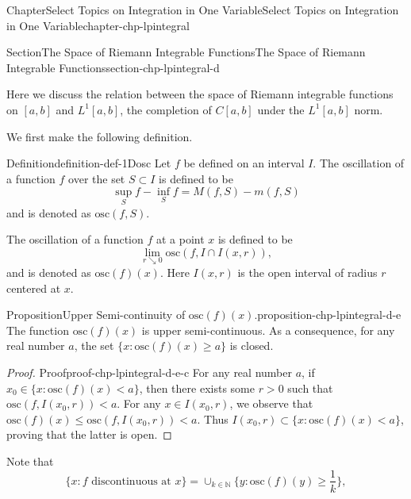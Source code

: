 \documentclass[oneside,10pt,]{book}
\numberwithin{equation}{section}
\newcommand{\bbN}{\mathbb{N}}
\newcommand{\osc}{\text{osc}}
\begin{document}
\begin{chapterptx}{Chapter}{Select Topics on Integration in One Variable}{}{Select Topics on Integration in One Variable}{}{}{chapter-chp-lpintegral}
\typeout{************************************************}
%
\begin{sectionptx}{Section}{The Space of Riemann Integrable Functions}{}{The Space of Riemann Integrable Functions}{}{}{section-chp-lpintegral-d}
\begin{introduction}{}%
Here we discuss the relation between the space of Riemann integrable functions on \([a, b]\) and \(L^{1}[a, b]\), the completion of \(C[a, b]\) under the \(L^{1}[a, b]\) norm.\end{introduction}%
We first make the following definition.%
\begin{definition}{Definition}{}{definition-def-1Dosc}%
%
\label{notation-def-1Dosc-b}%
Let \(f\) be defined on an interval \(I\). The oscillation of a function \(f\) over the set \(S \subset I\) is defined to be%
\begin{equation*}
\sup_{S}f - \inf_{S}f = M(f, S)-m(f, S)
\end{equation*}
and is denoted as \(\osc(f, S)\).%
\par
The oscillation of a function \(f\)  at a point \(x\) is defined to be%
\begin{equation*}
\lim_{r\searrow 0} \osc(f, I\cap I(x, r)),
\end{equation*}
and is denoted as \(\osc(f)(x)\). Here \(I(x, r)\) is the open interval of radius \(r\) centered at \(x\).%
\end{definition}
\begin{proposition}{Proposition}{Upper Semi-continuity of \(\osc(f)(x)\).}{}{proposition-chp-lpintegral-d-e}%
The function \(\osc(f)(x)\) is upper 	semi-continuous. As a consequence, for any real number \(a\), the set \(\{x: 	\osc(f)(x)\ge a \}\) is closed.\end{proposition}
\begin{proof}{Proof}{}{proof-chp-lpintegral-d-e-c}
For any real number \(a\), if \(x_{0}\in \{x: 	\osc(f)(x) < a\}\), then there exists some \(r>0\) such that \(\osc(f, I(x_{0}, r)) < a\). For any \(x \in I(x_{0}, r)\), we observe that \(\osc(f)(x)\le \osc(f, I(x_{0}, r)) < a\). Thus \(I(x_{0}, r) \subset \{x: 	\osc(f)(x) < a\}\), proving that the latter is open.%
\end{proof}
Note that%
\begin{equation}
\{x: f \text{ discontinuous at } x\}=
\cup_{k\in \bbN} \{y: \osc(f)(y)\ge \frac 1k\},\label{men-eqn-1Ddiscont}
\end{equation}

\end{sectionptx}
\end{chapterptx}
\end{document}
